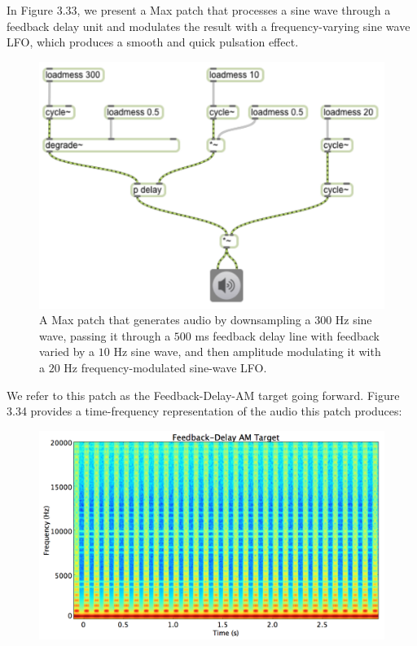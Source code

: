 \documentclass[a4paper,12pt]{report} 	%
\numberwithin{figure}{chapter}
\numberwithin{table}{chapter}
\numberwithin{equation}{chapter}
\begin{document}
\begin{flushleft}
In Figure 3.33, we present a Max patch that processes a sine wave through a feedback delay unit and modulates the result with a frequency-varying sine wave LFO, which produces a smooth and quick pulsation effect. 
\begin{figure}[h!]
\begin{center}
\includegraphics[scale=0.8]{DelayFeedbackAM}
\caption[Delay Feedback AM Max Patch]{A Max patch that generates audio by downsampling a $300$ Hz sine wave, passing it through a $500$ ms feedback delay line with feedback varied by a $10$ Hz sine wave, and then amplitude modulating it with a $20$ Hz frequency-modulated sine-wave LFO.}
\end{center}
\end{figure}
We refer to this patch as the Feedback-Delay-AM target going forward. Figure 3.34 provides a time-frequency representation of the audio this patch produces:
\begin{figure}[h!]
\begin{center}
\includegraphics[width=\linewidth]{FeedbackDelayAMTargetSTFT}

\end{center}
\end{figure}
\end{flushleft}
\end{document}
